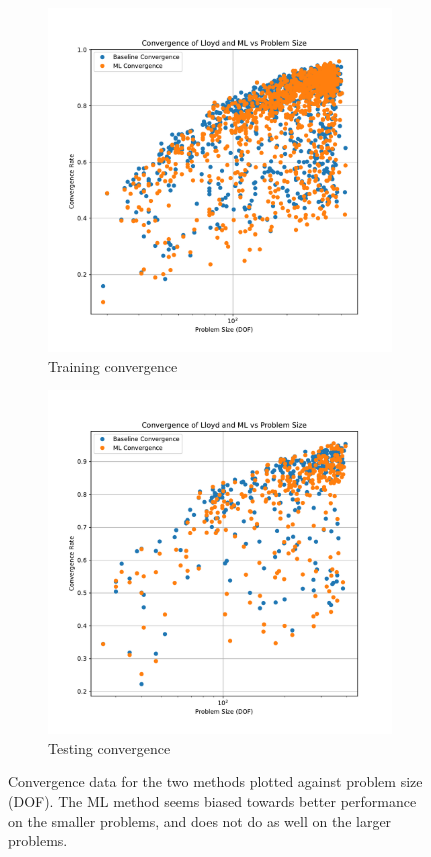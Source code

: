 \documentclass{article}
\begin{document}
\begin{figure}[h]
  \centering
  \begin{subfigure}[t]{0.49\textwidth}
    \centering
    \includegraphics[width=\textwidth]{aniso_train_convergence_per_size.pdf}
    \caption{Training convergence}
  \end{subfigure}
  \begin{subfigure}[t]{0.49\textwidth}
    \centering
    \includegraphics[width=\textwidth]{aniso_test_convergence_per_size.pdf}
    \caption{Testing convergence}
  \end{subfigure}
  \caption{Convergence data for the two methods plotted against problem size (DOF).  The ML method seems biased towards better performance on the smaller problems, and does not do as well on the larger problems.}
  \label{fig:aniso_conv_per_size}
\end{figure}
\end{document}
